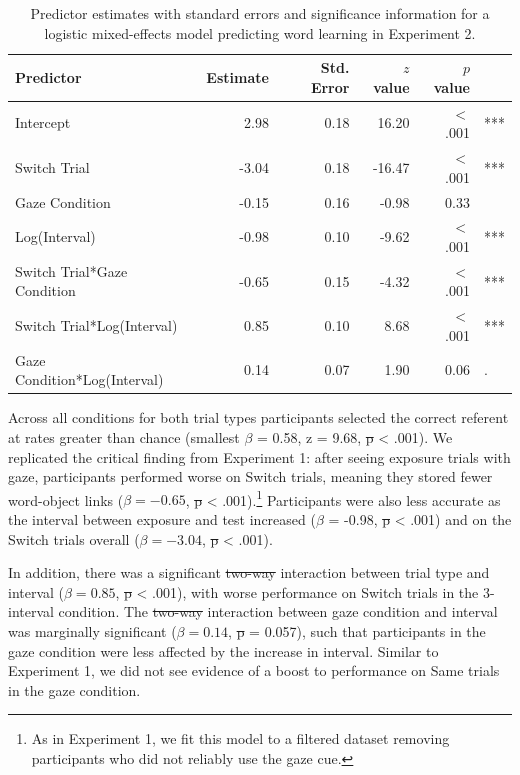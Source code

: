 \documentclass[authoryear, review]{elsarticle}
\providecommand{\DIFaddtex}[1]{{\protect\color{blue}\uwave{#1}}} %
\providecommand{\DIFdeltex}[1]{{\protect\color{red}\sout{#1}}}                      %
\providecommand{\DIFaddbegin}{} %
\providecommand{\DIFaddend}{} %
\providecommand{\DIFdelbegin}{} %
\providecommand{\DIFdelend}{} %
\providecommand{\DIFadd}[1]{\texorpdfstring{\DIFaddtex{#1}}{#1}} %
\providecommand{\DIFdel}[1]{\texorpdfstring{\DIFdeltex{#1}}{}} %
\begin{document}
\begin{table}[tb]
\centering
\begin{tabular}{lrrrrl}
 Predictor & Estimate & Std. Error & $z$ value & $p$ value &  \\ 
  \hline
Intercept & 2.98 & 0.18 & 16.20 & $<$ .001 & *** \\ 
  Switch Trial & -3.04 & 0.18 & -16.47 & $<$ .001 & *** \\ 
  Gaze Condition & -0.15 & 0.16 & -0.98 & 0.33 &  \\ 
  Log(Interval) & -0.98 & 0.10 & -9.62 & $<$ .001 & *** \\ 
  Switch Trial*Gaze Condition & -0.65 & 0.15 & -4.32 & $<$ .001 & *** \\ 
  Switch Trial*Log(Interval) & 0.85 & 0.10 & 8.68 & $<$ .001 & *** \\ 
  Gaze Condition*Log(Interval) & 0.14 & 0.07 & 1.90 & 0.06 & . \\ 
   \hline
\end{tabular}
\caption{Predictor estimates with standard errors and significance information for a logistic mixed-effects model predicting word learning in Experiment 2.} 
\label{tab:exp2_reg}
\end{table}

Across all conditions for both trial types participants selected the
correct referent at rates greater than chance (smallest \(\beta\) =
0.58, z = 9.68, \DIFdelbegin \DIFdel{p }\DIFdelend \DIFaddbegin \DIFadd{\(p\) }\DIFaddend \textless{} .001). We replicated the critical
finding from Experiment 1: after seeing exposure trials with gaze,
participants performed worse on Switch trials, meaning they stored fewer
word-object links (\(\beta = -0.65\), \DIFdelbegin \DIFdel{p }\DIFdelend \DIFaddbegin \DIFadd{\(p\) }\DIFaddend \textless{}
.001).\footnote{As in Experiment 1, we fit this model to a filtered dataset removing participants who did not reliably use the gaze cue.}
Participants were also less accurate as the interval between exposure
and test increased (\(\beta\) = -0.98, \DIFdelbegin \DIFdel{p }\DIFdelend \DIFaddbegin \DIFadd{\(p\) }\DIFaddend \textless{} .001) and on
the Switch trials overall (\(\beta = -3.04\), \DIFdelbegin \DIFdel{p }\DIFdelend \DIFaddbegin \DIFadd{\(p\) }\DIFaddend \textless{} .001).

In addition, there was a significant \DIFdelbegin \DIFdel{two-way }\DIFdelend interaction between trial type and
interval (\(\beta = 0.85\), \DIFdelbegin \DIFdel{p }\DIFdelend \DIFaddbegin \DIFadd{\(p\) }\DIFaddend \textless{} .001), with worse
performance on Switch trials in the 3-interval condition. The
\DIFdelbegin \DIFdel{two-way
}\DIFdelend interaction between gaze condition and interval was marginally
significant (\(\beta = 0.14\), \DIFdelbegin \DIFdel{p }\DIFdelend \DIFaddbegin \DIFadd{\(p\) }\DIFaddend = 0.057), such that participants in
the gaze condition were less affected by the increase in interval.
Similar to Experiment 1, we did not see evidence of a boost to
performance on Same trials in the gaze condition.
\end{document}
